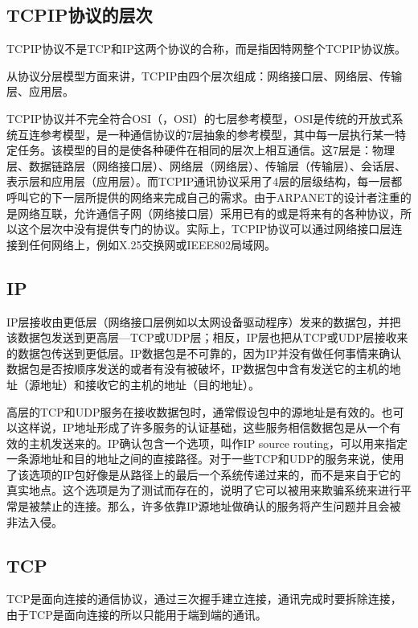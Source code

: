 \subsection{\acrshort{TCPIP}协议的层次}
\acrshort{TCPIP}协议不是TCP和IP这两个协议的合称，而是指因特网整个\acrshort{TCPIP}协议族。

从协议分层模型方面来讲，\acrshort{TCPIP}由四个层次组成：网络接口层、网络层、传输层、应用层。

\acrshort{TCPIP}协议并不完全符合OSI（，\acrlong{OSI}）的七层参考模型，\acrshort{OSI}是传统的开放式系统互连参考模型，是一种通信协议的7层抽象的参考模型，其中每一层执行某一特定任务。该模型的目的是使各种硬件在相同的层次上相互通信。这7层是：物理层、数据链路层（网络接口层）、网络层（网络层）、传输层（传输层）、会话层、表示层和应用层（应用层）。而\acrshort{TCPIP}通讯协议采用了4层的层级结构，每一层都呼叫它的下一层所提供的网络来完成自己的需求。由于ARPANET的设计者注重的是网络互联，允许通信子网（网络接口层）采用已有的或是将来有的各种协议，所以这个层次中没有提供专门的协议。实际上，\acrshort{TCPIP}协议可以通过网络接口层连接到任何网络上，例如X.25交换网或IEEE802局域网。

\subsection{IP}
IP层接收由更低层（网络接口层例如以太网设备驱动程序）发来的数据包，并把该数据包发送到更高层---TCP或UDP层；相反，IP层也把从TCP或UDP层接收来的数据包传送到更低层。IP数据包是不可靠的，因为IP并没有做任何事情来确认数据包是否按顺序发送的或者有没有被破坏，IP数据包中含有发送它的主机的地址（源地址）和接收它的主机的地址（目的地址）。

高层的TCP和UDP服务在接收数据包时，通常假设包中的源地址是有效的。也可以这样说，IP地址形成了许多服务的认证基础，这些服务相信数据包是从一个有效的主机发送来的。IP确认包含一个选项，叫作IP source routing，可以用来指定一条源地址和目的地址之间的直接路径。对于一些TCP和UDP的服务来说，使用了该选项的IP包好像是从路径上的最后一个系统传递过来的，而不是来自于它的真实地点。这个选项是为了测试而存在的，说明了它可以被用来欺骗系统来进行平常是被禁止的连接。那么，许多依靠IP源地址做确认的服务将产生问题并且会被非法入侵。

\subsection{TCP}
TCP是面向连接的通信协议，通过三次握手建立连接，通讯完成时要拆除连接，由于TCP是面向连接的所以只能用于端到端的通讯。

